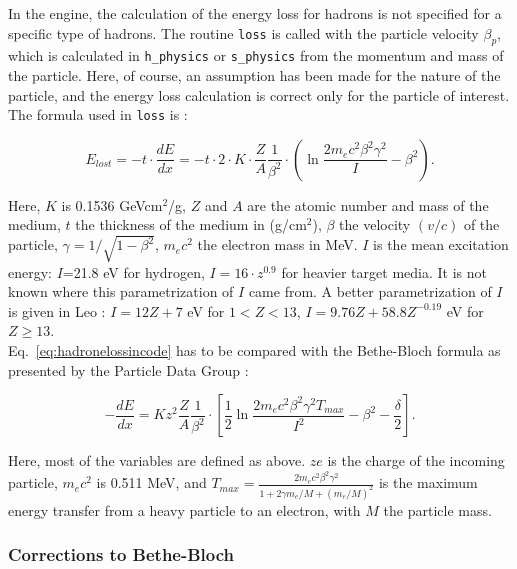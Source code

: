 In the engine, the calculation of the energy loss for hadrons is not specified for a
specific type of hadrons. The routine {\tt loss} is called with the particle velocity 
$\beta_p$, which is calculated in {\tt h\_physics} or {\tt s\_physics} from the momentum 
and mass of the particle. Here, of course, an assumption has been made for the nature of 
the particle, and the energy loss calculation is correct only for the particle of 
interest.\\
The formula used in {\tt loss} is \cite{engine}:

\begin{equation}
\label{eq:hadronelossincode}
{E_{lost}} = -t\cdot\frac{dE}{dx} = -t \cdot 2 \cdot K\cdot \frac{Z}{A} \frac{1}{\beta^2}
\cdot \left( \ln{ \frac{2 m_e c^2 \beta^2 \gamma^2}{I}} - \beta^2 \right).
\end{equation}

Here, $K$ is 0.1536 GeVcm$^2$/g, $Z$ and $A$ are the atomic number and mass of
the medium, $t$ the thickness of the medium in (g/cm$^2$), $\beta$ the velocity $(v/c)$
of the particle, $\gamma=1/\sqrt{1-\beta^2}$, $m_e c^2$ the electron mass in MeV. $I$ 
is the mean excitation energy: $I$=21.8 eV for hydrogen, $I=16\cdot z^{0.9}$ for heavier 
target media. It is not known where this parametrization of $I$ came from. A better
parametrization of $I$ is given in Leo \cite{leo}: $I=12Z+7$ eV for $1<Z<13$, 
$I=9.76Z+58.8Z^{-0.19}$ eV for $Z\geq13$.\\

Eq.~\ref{eq:hadronelossincode} has to be compared with the Bethe-Bloch formula as 
presented by the Particle Data Group \cite{PDG54}:

\begin{equation}
\label{eq:BBPDG54221}
-\frac{dE}{dx}=K z^2 \frac{Z}{A} \frac{1}{\beta^2} \cdot \left[ 
  \frac{1}{2} \ln{\frac{2 m_e c^2 \beta^2 \gamma^2 T_{max}}{I^2}} 
  - \beta^2 - \frac{\delta}{2} \right].
\end{equation}

Here, most of the variables are defined as above. $ze$ is the charge of the incoming
particle, $m_e c^2$ is 0.511 MeV, and $T_{max}=\frac{2 m_e c^2 \beta^2 \gamma^2}
{1+2\gamma m_e/M+(m_e/M)^2}$ is the maximum energy transfer from a heavy particle to an 
electron, with $M$ the particle mass. 

\subsubsection{Corrections to Bethe-Bloch}
\label{subsubsection:hadroncorrections}
\hspace*{\parindent}


